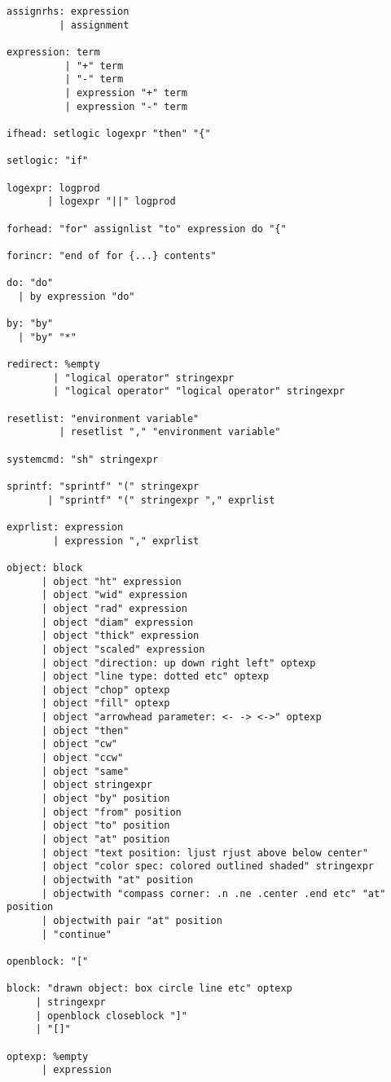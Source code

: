 \documentclass[11pt]{article}
\begin{document}
\begin{verbatim}
assignrhs: expression
         | assignment

expression: term
          | "+" term
          | "-" term
          | expression "+" term
          | expression "-" term

ifhead: setlogic logexpr "then" "{"

setlogic: "if"

logexpr: logprod
       | logexpr "||" logprod

forhead: "for" assignlist "to" expression do "{"

forincr: "end of for {...} contents"

do: "do"
  | by expression "do"

by: "by"
  | "by" "*"

redirect: %empty
        | "logical operator" stringexpr
        | "logical operator" "logical operator" stringexpr

resetlist: "environment variable"
         | resetlist "," "environment variable"

systemcmd: "sh" stringexpr

sprintf: "sprintf" "(" stringexpr
       | "sprintf" "(" stringexpr "," exprlist

exprlist: expression
        | expression "," exprlist

object: block
      | object "ht" expression
      | object "wid" expression
      | object "rad" expression
      | object "diam" expression
      | object "thick" expression
      | object "scaled" expression
      | object "direction: up down right left" optexp
      | object "line type: dotted etc" optexp
      | object "chop" optexp
      | object "fill" optexp
      | object "arrowhead parameter: <- -> <->" optexp
      | object "then"
      | object "cw"
      | object "ccw"
      | object "same"
      | object stringexpr
      | object "by" position
      | object "from" position
      | object "to" position
      | object "at" position
      | object "text position: ljust rjust above below center"
      | object "color spec: colored outlined shaded" stringexpr
      | objectwith "at" position
      | objectwith "compass corner: .n .ne .center .end etc" "at" position
      | objectwith pair "at" position
      | "continue"

openblock: "["

block: "drawn object: box circle line etc" optexp
     | stringexpr
     | openblock closeblock "]"
     | "[]"

optexp: %empty
      | expression


\end{verbatim}
\end{document}
